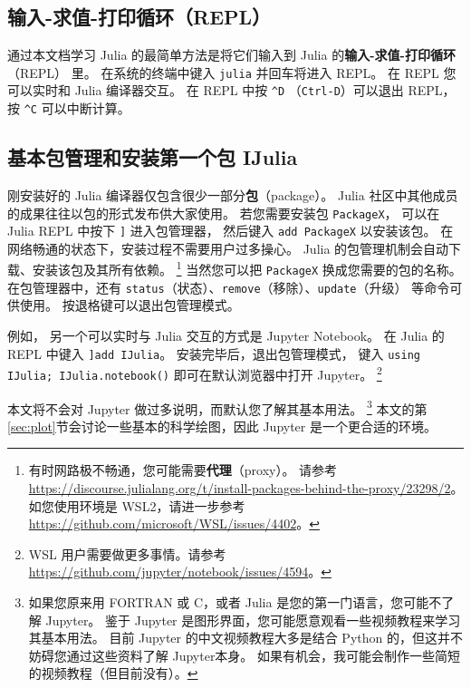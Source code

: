 \documentclass[10pt,a4paper]{article}
\begin{document}
\subsection{输入-求值-打印循环（REPL）}
通过本文档学习 Julia 的最简单方法是将它们输入到 Julia 的\textbf{输入-求值-打印循环}（REPL） 里。
在系统的终端中键入 \lstinline|julia| 并回车将进入 REPL。
在 REPL 您可以实时和 Julia 编译器交互。
在 REPL 中按 \lstinline|^D| （\lstinline|Ctrl-D|）可以退出 REPL，
按 \lstinline|^C| 可以中断计算。

\subsection{基本包管理和安装第一个包 IJulia}

刚安装好的 Julia 编译器仅包含很少一部分\textbf{包}（package）。
Julia 社区中其他成员的成果往往以包的形式发布供大家使用。
若您需要安装包 \lstinline|PackageX|，
可以在 Julia REPL 中按下 \lstinline|]| 进入包管理器，
然后键入 \lstinline|add PackageX| 以安装该包。
在网络畅通的状态下，安装过程不需要用户过多操心。
Julia 的包管理机制会自动下载、安装该包及其所有依赖。
\footnote{
	有时网路极不畅通，您可能需要\textbf{代理}（proxy）。
	请参考 \url{https://discourse.julialang.org/t/install-packages-behind-the-proxy/23298/2}。
	如您使用环境是 WSL2，请进一步参考 \url{https://github.com/microsoft/WSL/issues/4402}。
}
当然您可以把 \lstinline|PackageX| 换成您需要的包的名称。
在包管理器中，还有 \lstinline|status|（状态）、\lstinline|remove|（移除）、\lstinline|update|（升级） 等命令可供使用。
按退格键可以退出包管理模式。

例如，
另一个可以实时与 Julia 交互的方式是 Jupyter Notebook。
在 Julia 的 REPL 中键入 \lstinline|]add IJulia|。
安装完毕后，退出包管理模式，
键入 \lstinline|using IJulia; IJulia.notebook()| 即可在默认浏览器中打开 Jupyter。
\footnote{
WSL 用户需要做更多事情。请参考 
\url{https://github.com/jupyter/notebook/issues/4594}。
}

本文将不会对 Jupyter 做过多说明，而默认您了解其基本用法。
\footnote{
	如果您原来用 FORTRAN 或 C，或者 Julia 是您的第一门语言，您可能不了解 Jupyter。
	鉴于 Jupyter 是图形界面，您可能愿意观看一些视频教程来学习其基本用法。
	目前 Jupyter 的中文视频教程大多是结合 Python 的，但这并不妨碍您通过这些资料了解 Jupyter本身。
	如果有机会，我可能会制作一些简短的视频教程（但目前没有）。
}
本文的第\ref{sec:plot}节会讨论一些基本的科学绘图，因此 Jupyter 是一个更合适的环境。

\end{document}
